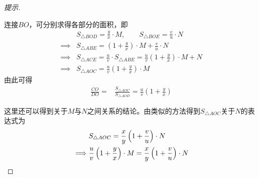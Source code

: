 \begin{proof}[提示]
\begin{center}
  \end{center}
  连接$BO$，可分别求得各部分的面积，即
  \begin{align*}
    &S_{\triangle BOD} = \frac{y}{x}\cdot M,\quad\quad
    S_{\triangle BOE} = \frac{v}{u}\cdot N\\
    \implies& S_{\triangle ABE} = \left(1 + \frac{y}{x}\right)\cdot M + \frac{v}{u}\cdot N \\
    \implies& S_{\triangle ACE} = \frac{u}{v}\cdot S_{\triangle ABE} =
              \frac{u}{v}\left(1+\frac{y}{x}\right)\cdot M + N\\
    \implies& S_{\triangle AOC} = \frac{u}{v}\left(1+\frac{y}{x}\right)\cdot M
  \end{align*}
  由此可得
  \begin{align*}
    \frac{CO}{DO}= & \frac{S_{\triangle AOC}}{S_{\triangle AOD}}= \frac{u}{v}\left(1+\frac{y}{x}\right)
  \end{align*}

  这里还可以得到关于$M$与$N$之间关系的结论。由类似的方法得到$S_{\triangle AOC}$关于$N$的表达式为
  \begin{align*}
    & S_{\triangle AOC} = \frac{x}{y}\left(1+\frac{v}{u}\right)\cdot N\\
    \implies & \frac{u}{v}\left(1+\frac{y}{x}\right)\cdot M = \frac{x}{y}\left(1+\frac{v}{u}\right)\cdot N\qedhere
  \end{align*}
\end{proof}

